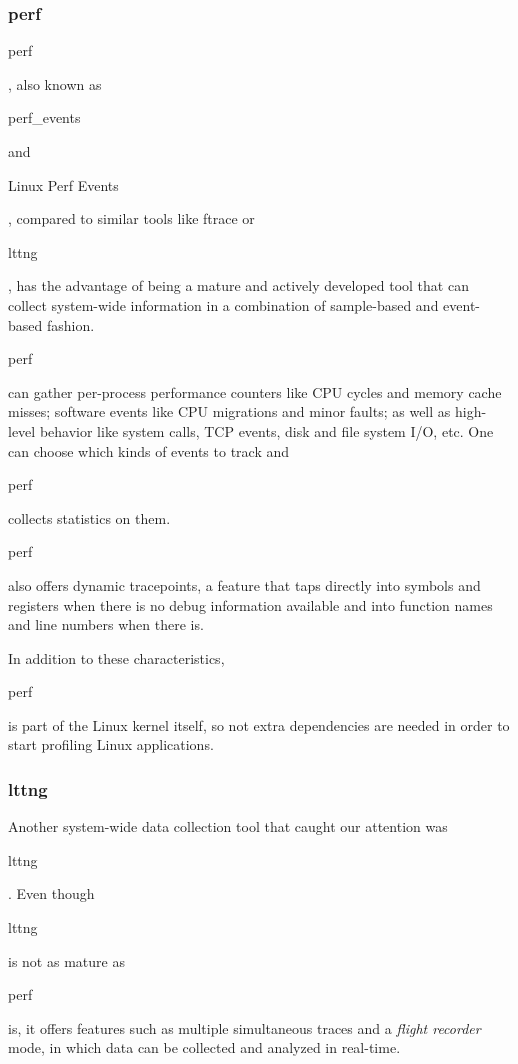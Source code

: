 \documentclass[10pt]{article}
\begin{document}
\subsubsection{perf}

\begin{tt}perf\end{tt}, also known as \begin{tt}perf\_events\end{tt} and
\begin{tt}Linux Perf Events\end{tt}, compared to similar tools like ftrace or
\begin{tt}lttng\end{tt}, has the advantage of being a mature and actively
developed tool that can collect system-wide information in a combination of
sample-based and event-based fashion.

\begin{tt}perf\end{tt} can gather per-process performance counters like CPU
cycles and memory cache misses; software events like CPU migrations and minor
faults; as well as high-level behavior like system calls, TCP events, disk and
file system I/O, etc. One can choose which kinds of events to track and
\begin{tt}perf\end{tt} collects statistics on them.

\begin{tt}perf\end{tt} also offers dynamic tracepoints, a feature that taps
directly into symbols and registers when there is no debug information
available and into function names and line numbers when there is.

In addition to these characteristics,\begin{tt}perf\end{tt} is part of the
Linux kernel itself, so not extra dependencies are needed in order to start
profiling Linux applications.

\subsubsection{lttng}

Another system-wide data collection tool that caught our attention was
\begin{tt}lttng\end{tt}. Even though \begin{tt}lttng\end{tt} is not as mature
as \begin{tt}perf\end{tt} is, it offers features such as multiple simultaneous
traces and a \emph{flight recorder} mode, in which data can be collected and
analyzed in real-time.
\end{document}
